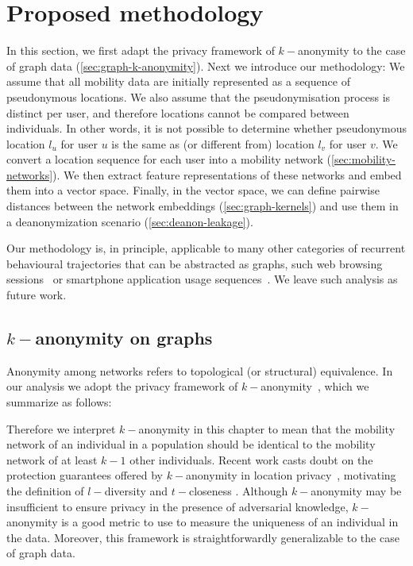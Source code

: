\section{Proposed methodology\label{sec:methodology}}

 In this section, we first adapt the privacy framework of $k-$anonymity to the case of graph data (\cref{sec:graph-k-anonymity}). Next we introduce our methodology: We assume that all mobility data are initially represented as a sequence of pseudonymous locations.
We also assume that the pseudonymisation process is distinct per user, and therefore locations cannot be compared between individuals.
In other words, it is not possible to determine whether pseudonymous location $l_u$ for user $u$ is the same as (or different from) location $l_v$ for user $v$.
We convert a location sequence for each user into a mobility network (\cref{sec:mobility-networks}). 
We then extract feature representations of these networks and embed them into a vector space.
Finally, in the vector space, we can define pairwise distances between the network embeddings (\cref{sec:graph-kernels}) and use them in a deanonymization scenario (\cref{sec:deanon-leakage}).  

Our methodology is, in principle, applicable to many other categories of recurrent behavioural trajectories that can be abstracted as graphs, such web browsing sessions~\cite{olejnik14, yen12} or smartphone application usage sequences~\cite{Welke2016}.
We leave such analysis as future work.

\subsection{$k-$anonymity on graphs\label{sec:graph-k-anonymity}}

Anonymity among networks refers to topological (or structural) equivalence. In our analysis we adopt the privacy framework of $k-$anonymity~\cite{sweeney2002k}, which we summarize as follows:


\vspace{.4cm}
Therefore we interpret $k-$anonymity in this chapter to mean that the mobility network of an individual in a population should be identical to the mobility network of at least $k-1$ other individuals.
Recent work casts doubt on the protection guarantees offered by \mbox{$k-$anonymity} in location privacy~\cite{shokri2010}, motivating the definition of $l-$diversity \cite{Machanavajjhala2007} and $t-$closeness \cite{li2007}.
Although $k-$anonymity may be insufficient to ensure privacy in the presence of adversarial knowledge, \mbox{$k-$anonymity} is a good metric to use to measure the uniqueness of an individual in the data.
Moreover, this framework is straightforwardly generalizable to the case of graph data.


